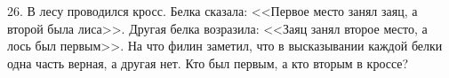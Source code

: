 26. В лесу проводился кросс. Белка сказала: <<Первое место занял заяц, а второй была лиса>>. Другая белка возразила: <<Заяц занял второе место, а лось был первым>>. На что филин заметил, что в высказывании каждой белки одна часть верная, а другая нет. Кто был первым, а кто вторым в кроссе?\\
